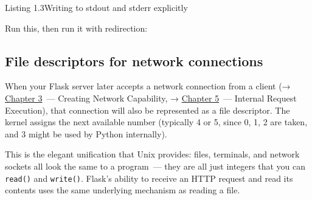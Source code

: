 \begin{codeboxcap}[short]{\textcolor{accent}{Listing 1.3}\enspace Writing to stdout and stderr explicitly}

\begin{Shaded}
\begin{Highlighting}[]

\NormalTok{(}\NormalTok{)               }
\NormalTok{(}\NormalTok{, }\OperatorTok{=}
\end{Highlighting}
\end{Shaded}

\end{codeboxcap}

\noindent{}Run this, then run it with redirection:

\begin{codebox}[short]

\begin{Shaded}
\begin{Highlighting}[]
\OperatorTok{\textgreater{}}
\end{Highlighting}
\end{Shaded}

\end{codebox}

\subsection*{File descriptors for network connections}\label{01-command-to-process:file-descriptors-for-network-connections}

When your Flask server later accepts a network connection from a client (→ \hyperref[ch:03-network-capability]{Chapter 3}~--- Creating Network Capability, → \hyperref[ch:05-internal-request-execution]{Chapter 5}~--- Internal Request Execution), that connection will also be represented as a file descriptor. The kernel assigns the next available number (typically 4 or 5, since 0, 1, 2 are taken, and 3 might be used by Python internally).

This is the elegant unification that Unix provides: files, terminals, and network sockets all look the same to a program~--- they are all just integers that you can \texttt{read()} and \texttt{write()}. Flask's ability to receive an HTTP request and read its contents uses the same underlying mechanism as reading a file.

